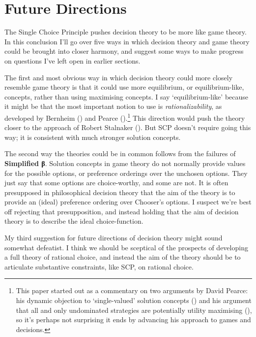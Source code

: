 \documentclass[
  10pt,
  letterpaper,
  DIV=11,
  numbers=noendperiod,
  twoside]{scrartcl}
\begin{document}
\section{Future Directions}\label{sec-conclusion}

The Single Choice Principle pushes decision theory to be more like game
theory. In this conclusion I'll go over five ways in which decision
theory and game theory could be brought into closer harmony, and suggest
some ways to make progress on questions I've left open in earlier
sections.

The first and most obvious way in which decision theory could more
closely resemble game theory is that it could use more equilibrium, or
equilibrium-like, concepts, rather than using maximising concepts. I say
`equilibrium-like' because it might be that the most important notion to
use is \emph{rationalizability}, as developed by Bernheim
() and Pearce
().\footnote{This paper started out as a
  commentary on two arguments by David Pearce: his dynamic objection to
  `single-valued' solution concepts ()
  and his argument that all and only undominated strategies are
  potentially utility maximising (), so
  it's perhaps not surprising it ends by advancing his approach to games
  and decisions.} This direction would push the theory closer to the
approach of Robert Stalnaker (). But
SCP doesn't require going this way; it is consistent with much stronger
solution concepts.

The second way the theories could be in common follows from the failures
of \textbf{Simplified β}. Solution concepts in game theory do not
normally provide values for the possible options, or preference
orderings over the unchosen options. They just say that some options are
choice-worthy, and some are not. It is often presupposed in
philosophical decision theory that the aim of the theory is to provide
an (ideal) preference ordering over Chooser's options. I suspect we're
best off rejecting that presupposition, and instead holding that the aim
of decision theory is to describe the ideal choice-function.

My third suggestion for future directions of decision theory might sound
somewhat defeatist. I think we should be sceptical of the prospects of
developing a full theory of rational choice, and instead the aim of the
theory should be to articulate substantive constraints, like SCP, on
rational choice.
\end{document}
